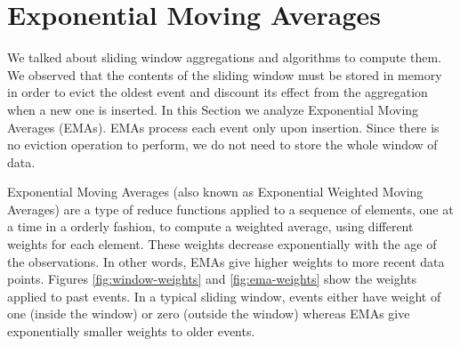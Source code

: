 \section{Exponential Moving Averages} \label{sec:emas}

We talked about sliding window aggregations and algorithms to compute them. We observed that the contents of the sliding window must be stored in memory in order to evict the oldest event and discount its effect from the aggregation when a new one is inserted. In this Section we analyze Exponential Moving Averages (EMAs). EMAs process each event only upon insertion. Since there is no eviction operation to perform, we do not need to store the whole window of data.

Exponential Moving Averages (also known as Exponential Weighted Moving Averages) \cite{EMA-Everett2011, EMA-Hunter, EMA-MarcusB} are a type of reduce functions applied to a sequence of elements, one at a time in a orderly fashion, to compute a weighted average, using different weights for each element. These weights decrease exponentially with the age of the observations. In other words, EMAs give higher weights to more recent data points. Figures \ref{fig:window-weights} and \ref{fig:ema-weights} show the weights applied to past events. In a typical sliding window, events either have weight of one (inside the window) or zero (outside the window) whereas EMAs give exponentially smaller weights to older events.

